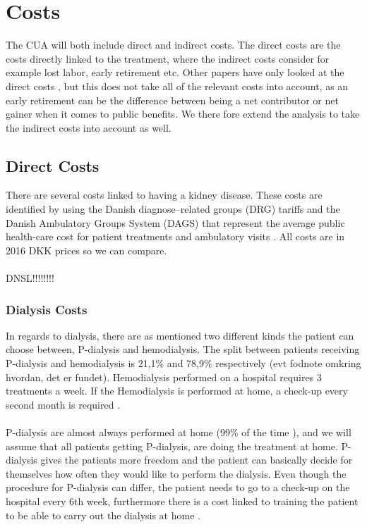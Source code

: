 \documentclass[a4paper,12pt]{article}
\begin{document}
\section{Costs}
The CUA will both include direct and indirect costs. The direct costs are the costs directly linked to the treatment, where the indirect costs consider for example lost labor, early retirement etc.   Other papers have only looked at the direct costs \cite{CUAdkartikel}, but this does not take all of the relevant costs into account, as an early retirement can be the difference between being a net contributor or net gainer when it comes to public  benefits.  We there fore extend the analysis to take the indirect costs into account as well. 

\subsection{Direct Costs}
There are several costs linked to having a kidney disease. These costs are identified by using the Danish diagnose–related groups (DRG) tariffs and the Danish Ambulatory Groups System (DAGS) that represent the average public health-care cost for patient treatments and ambulatory visits \cite{takst}. All costs are in 2016 DKK prices so we can compare.
\\\\
DNSL!!!!!!!!

\subsubsection*{Dialysis Costs}

 In regards to dialysis, there are as mentioned two different kinds the patient can choose between, P-dialysis and hemodialysis. The split between patients receiving P-dialysis and hemodialysis is 21,1\% and 78,9\% respectively \cite{DNSL} (evt fodnote omkring hvordan, det er fundet). Hemodialysis performed on a hospital requires 3 treatments a week. If the Hemodialysis is performed at home, a check-up every second month is required \cite{Rigshospitalet}.  
 \\\\
 P-dialysis are almost always performed at home (99\% of the time \cite{DNSL}), and we will assume that all patients getting P-dialysis, are doing the treatment at home. P-dialysis gives the patients more freedom and the patient can basically decide for themselves how often they would like to perform the dialysis. Even though the procedure for P-dialysis can differ, the patient needs to go to a check-up on the hospital every 6th week, furthermore there is a cost linked to training the patient to be able to carry out the dialysis at home \cite{P-dialyse}. 
\end{document}
